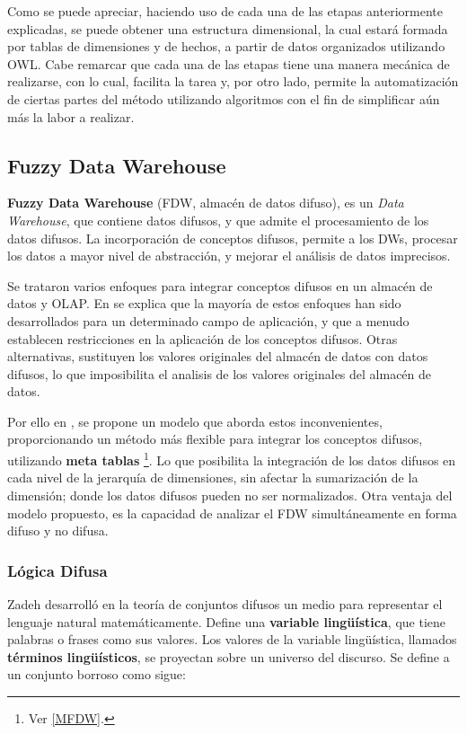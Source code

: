 \documentclass[a4paper,11pt]{article}
\begin{document}
    
    Como se puede apreciar, haciendo uso de cada una de las etapas anteriormente explicadas, se puede obtener una estructura dimensional, la cual estará
    formada por tablas de dimensiones y de hechos, a partir de datos organizados utilizando OWL. Cabe remarcar que cada una de las etapas tiene una manera
    mecánica de realizarse, con lo cual, facilita la tarea y, por otro lado, permite la automatización de ciertas partes del método utilizando algoritmos con el
    fin de simplificar aún más la labor a realizar.
    
    \subsection{Fuzzy Data Warehouse}
    
    \textbf{Fuzzy Data Warehouse} (FDW, almacén de datos difuso), es un \textit{Data Warehouse}, que contiene datos difusos, y que admite el procesamiento
    de los datos difusos.
    La incorporación de conceptos difusos, permite a los DWs, procesar los datos a mayor nivel de abstracción, y mejorar el análisis de datos imprecisos.
    
    Se trataron varios enfoques para integrar conceptos difusos en un almacén de datos y OLAP. 
    En \cite{Fasel14} se explica que la mayoría de estos enfoques han sido desarrollados para un determinado campo de aplicación, y que a menudo establecen
    restricciones en la aplicación de los conceptos difusos.
    Otras alternativas, sustituyen los valores originales del almacén de datos con datos difusos, lo que imposibilita el analisis de los valores originales del
    almacén de datos.
    
    Por ello en \cite{Fasel14}, se propone un modelo que aborda estos inconvenientes, proporcionando un método más flexible para integrar los conceptos difusos,
    utilizando \textbf{meta tablas} \footnote{Ver \ref{MFDW}.}.
    Lo que posibilita la integración de los datos difusos en cada nivel de la jerarquía de dimensiones, sin afectar la sumarización de la dimensión; donde los datos
    difusos pueden no ser normalizados. 
    Otra ventaja del modelo propuesto, es la capacidad de analizar el FDW simultáneamente en forma difuso y no difusa.
    
    \subsubsection{Lógica Difusa}
    
    Zadeh desarrolló en la teoría de conjuntos difusos un medio para representar el lenguaje natural matemáticamente. Define una \textbf{variable lingüística}, que tiene 
    palabras o frases como sus valores. Los valores de la variable lingüística, llamados \textbf{términos lingüísticos}, se proyectan sobre un universo del discurso.
    Se define a un conjunto borroso como sigue:
        
\end{document}
